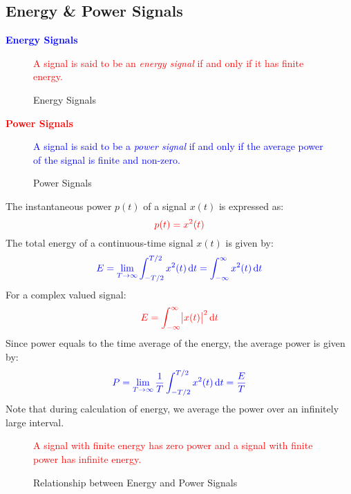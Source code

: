 \documentclass[a4paper,12pt]{report}
\begin{document}
\subsection{Energy \& Power Signals}
\textcolor{blue}{\textbf{Energy Signals}}
\vspace{-1em}
\begin{figure}[H]
    \centering
    \begin{mdframed}
        \begin{center}
            \textcolor{red}{%
                A signal is said to be an \emph{energy signal} if and only if it has finite energy.}
        \end{center}
    \end{mdframed}\label{fig:energy-signal-def-1}
    \vspace{-1em}\caption{Energy Signals}
\end{figure}
\vspace{-1em}
\noindent \textcolor{red}{\textbf{Power Signals}}
\vspace{-1em}
\begin{figure}[H]
    \centering
    \begin{mdframed}
        \begin{center}
            \textcolor{blue}{%
                A signal is said to be a \emph{power signal} if and only if the average power of the signal is finite and non-zero.}
        \end{center}
    \end{mdframed}\label{fig:power-signal-def-1}
    \vspace{-1em}\caption{Power Signals}
\end{figure}
\vspace{-1em}
\noindent The instantaneous power \(p(t)\) of a signal \(x(t)\) is expressed as:
\[
    \textcolor{red}{p(t) = x^2(t)}
\]
The total energy of a continuous-time signal \(x(t)\) is given by:
\[
    \textcolor{blue}{E = \lim_{T \to \infty} \int_{-T/2}^{T/2} x^2(t) \dif t = \int_{-\infty}^{\infty} x^2(t) \dif t}
\]
For a complex valued signal:
\[
    \textcolor{red}{E = \int_{-\infty}^{\infty} \abs{x(t)}^2 \dif t}
\]
Since power equals to the time average of the energy, the average power is given by:
\[
    \textcolor{blue}{P = \lim_{T \to \infty} \frac{1}{T} \int_{-T/2}^{T/2} x^2(t) \dif t = \frac{E}{T}}
\]
\newpage
\noindent Note that during calculation of energy, we average the power over an infinitely large interval.
\begin{figure}[H]
    \centering
    \begin{mdframed}
        \begin{center}
            \textcolor{red}{%
                A signal with finite energy has zero power and a signal with finite power has infinite energy.}
        \end{center}
    \end{mdframed}\label{fig:energy-power-relationship-1}
    \vspace{-1em}\caption{Relationship between Energy and Power Signals}
\end{figure}
\end{document}
